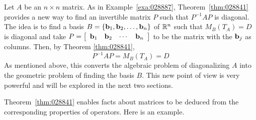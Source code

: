 Let $A$ be an $n \times n$ matrix. As in Example~\ref{exa:028887}, Theorem~\ref{thm:028841} provides a new way to find an invertible matrix $P$ such that $P^{-1}AP$ is diagonal. The idea is to find a basis $B = \{\textbf{b}_{1}, \textbf{b}_{2}, \dots, \textbf{b}_{n}\}$ of $\mathbb{R}^n$ such that $M_{B}(T_{A}) = D$ is diagonal and take $P = \left[ \begin{array}{cccc} \textbf{b}_{1} & \textbf{b}_{2} & \cdots & \textbf{b}_{n} \end{array} \right]$ to be the matrix with the $\textbf{b}_{j}$ as columns. Then, by Theorem \ref{thm:028841},
\begin{equation*}
P^{-1}AP = M_B(T_A) = D
\end{equation*}
As mentioned above, this converts the algebraic problem of diagonalizing $A$ into the geometric problem of finding the basis $B$. This new point of view is very powerful and will be explored in the next two sections.


Theorem~\ref{thm:028841} enables facts about matrices to be deduced from the corresponding properties of operators. Here is an example.


